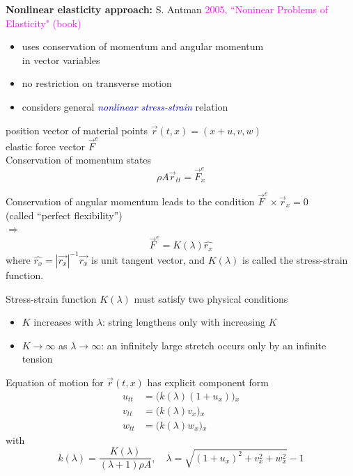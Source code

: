 \documentclass[landscape]{slides}
\def\myref#1{\textcolor{magenta}{\small #1}}
\def\myemph#1{\textcolor{blue}{\em #1}}
\begin{document}
\newpage

\textbf{Nonlinear elasticity approach:} S. Antman \myref{2005, ``Noninear Problems of Elasticity" (book)}

\begin{itemize}
\item
uses conservation of momentum and angular momentum \\
in vector variables
\item
no restriction on transverse motion
\item 
considers general \myemph{nonlinear stress-strain} relation
\end{itemize}
\hfil

position vector of material points $\vec{r}(t,x) = (x+u,v,w)$
\\

elastic force vector $\vec{F}^e$
\\

Conservation of momentum states
\[
\rho A \vec{r}_{tt} = \vec{F}^e_x
\]

Conservation of angular momentum leads to the condition 
$\vec{F}^e \times \vec{r}_x=0$ \\
(called ``perfect flexibility'') \\
$\Longrightarrow$
\[
\vec{F}^e = K(\lambda) \widehat{r_x}
\]
where $\widehat{r_x} = |\vec{r_x}|^{-1} \vec{r_x}$ is unit tangent vector,
and $K(\lambda)$ is called the stress-strain function.

\newpage

Stress-strain function $K(\lambda)$ must satisfy two physical conditions
\begin{itemize}
\item
$K$ increases with $\lambda$: string lengthens only with increasing $K$
\item
$K\to\infty$ as $\lambda\to\infty$: an infinitely large stretch occurs only by an infinite tension
\end{itemize}
\hfil

Equation of motion for $\vec{r}(t,x)$ has explicit component form
\begin{align*}
u_{tt} & =  \big( k(\lambda) (1+u_x) \big){}_x
\\
v_{tt} & = \big( k(\lambda) v_x \big){}_x
\\
w_{tt} & = \big( k(\lambda) w_x \big){}_x
\end{align*}
with
\[
k(\lambda) = \frac{K(\lambda)}{(\lambda+1)\rho A},
\quad
\lambda = \sqrt{(1+u_x)^2 + v_x^2 + w_x^2} -1
\]
\hfil
\end{document}
